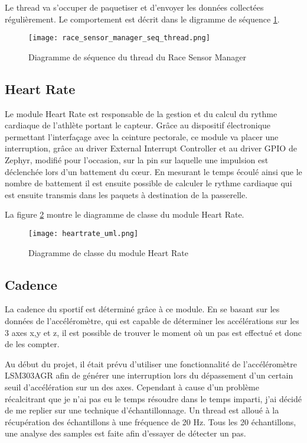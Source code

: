 Le thread va s'occuper de paquetiser et d'envoyer les données collectées régulièrement. Le comportement est décrit dans le digramme de séquence \ref{fig:race_sensor_manager_init_thread}.

\begin{figure}[htb]
\centering 
\texttt{[image: race\_sensor\_manager\_seq\_thread.png]} 
\caption{Diagramme de séquence du thread du Race Sensor Manager}
\label{fig:race_sensor_manager_init_thread}
\end{figure}

\subsection{Heart Rate}

Le module Heart Rate est responsable de la gestion et du calcul du rythme cardiaque de l'athlète portant le capteur. Grâce au dispositif électronique permettant l'interfaçage avec la ceinture pectorale, ce module va placer une interruption, grâce au driver External Interrupt Controller et au driver GPIO de Zephyr, modifié pour l'occasion, sur la pin sur laquelle une impulsion est déclenchée lors d'un battement du cœur.  En mesurant le temps écoulé ainsi que le nombre de battement il est ensuite possible de calculer le rythme cardiaque qui est ensuite transmis dans les paquets à destination de la passerelle.

La figure \ref{fig:heartrate_uml} montre le diagramme de classe du module Heart Rate.

\begin{figure}[htb]
\centering 
\texttt{[image: heartrate\_uml.png]} 
\caption{Diagramme de classe du module Heart Rate}
\label{fig:heartrate_uml}
\end{figure}

\subsection{Cadence}

La cadence du sportif est déterminé grâce à ce module. En se basant sur les données de l'accéléromètre, qui est capable de déterminer les accélérations sur les 3 axes x,y et z, il est possible de trouver le moment où un pas est effectué et donc de les compter. 

Au début du projet, il était prévu d'utiliser une fonctionnalité de l'accéléromètre LSM303AGR afin de générer une interruption lors du dépassement d'un certain seuil d'accélération sur un des axes. Cependant à cause d'un problème récalcitrant que je n'ai pas eu le temps résoudre dans le temps imparti, j'ai décidé de me replier sur une technique d'échantillonnage. Un thread est alloué à la récupération des échantillons à une fréquence de 20 Hz. Tous les 20 échantillons, une analyse des samples est faite afin d'essayer de détecter un pas.


